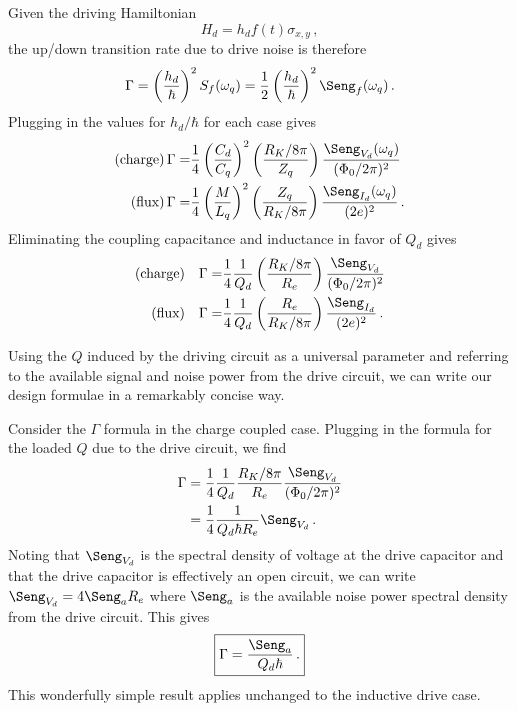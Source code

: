 Given the driving Hamiltonian
\begin{displaymath}
  H_d = h_d f(t) \sigma_{x,y} \, ,
\end{displaymath}
the up/down transition rate due to drive noise is therefore
\begin{equation*}
  \Gamma = \left( \frac{h_d}{\hbar} \right)^2 S_f(\omega_q) = \frac{1}{2} \left( \frac{h_d}{\hbar} \right)^2 \Seng_f(\omega_q) \, .
\end{equation*}
Plugging in the values for $h_d/\hbar$ for each case gives
\begin{align*}
  \text{(charge)} \, \Gamma =&
    \frac{1}{4} \left( \frac{C_d}{C_q} \right)^2
    \left( \frac{R_K/8\pi}{Z_q} \right) \frac{\Seng_{V_d}(\omega_q)}{(\Phi_0/2\pi)^2} \\
  \text{(flux)} \, \Gamma =&
    \frac{1}{4} \left( \frac{M}{L_q} \right)^2
    \left( \frac{Z_q}{R_K/8\pi} \right) \frac{\Seng_{I_d}(\omega_q)}{(2e)^2} \, .
\end{align*}
Eliminating the coupling capacitance and inductance in favor of $Q_d$ gives
\begin{align}
  \text{(charge)} \quad \Gamma =& \frac{1}{4} \frac{1}{Q_d} \left( \frac{R_K/8\pi}{R_e}\right) \frac{\Seng_{V_d}}{(\Phi_0/2\pi)^2} \\
  \text{(flux)} \quad \Gamma =& \frac{1}{4} \frac{1}{Q_d} \left( \frac{R_e}{R_K/8\pi} \right) \frac{\Seng_{I_d}}{(2e)^2} \, .
\end{align}


Using the $Q$ induced by the driving circuit as a universal parameter and referring to the available signal and noise power from the drive circuit, we can write our design formulae in a remarkably concise way.

Consider the $\Gamma$ formula in the charge coupled case.
Plugging in the formula for the loaded $Q$ due to the drive circuit, we find
\begin{align*}
  \Gamma
  & = \frac{1}{4} \frac{1}{Q_d} \frac{R_K / 8\pi}{R_e} \frac{\Seng_{V_d}}{(\Phi_0 / 2\pi)^2} \\
  & = \frac{1}{4} \frac{1}{Q_d \hbar R_e} \Seng_{V_d} \, .
\end{align*}
Noting that $\Seng_{V_d}$ is the spectral density of voltage at the drive capacitor and that the drive capacitor is effectively an open circuit, we can write $\Seng_{V_d} = 4 \Seng_a R_e$ where $\Seng_a$ is the available noise power spectral density from the drive circuit.
This gives
\begin{equation}
  \boxed{\Gamma = \frac{\Seng_a}{Q_d \hbar} \, .}
\end{equation}
This wonderfully simple result applies unchanged to the inductive drive case.

